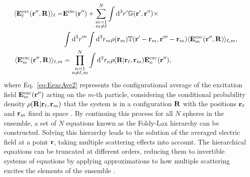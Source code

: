 %
\begin{subequations}%
	\begin{align}%
		\langle \vb{E}_\ell^\text{exc}(\vb{r}'',\vb{R})\rangle_\ell =& \vb{E}^\text{inc}(\vb{r}'')
		+ \sum_{\substack{m =1 \\ m\neq \ell}}^N  \int\dd^3 r' \mathbb{G}(\vb{r}',\vb{r}'') \times \notag\\
		& \int\dd^3 r'''\int \dd^3 r_m \rho(\vb{r}_m) \mathbb{T}(\vb{r}'-\vb{r}_m,\vb{r}'''-\vb{r}_m) \langle \vb{E}_m^\text{exc}(\vb{r}'',\vb{R})\rangle_{\ell,m},
		\\
		\langle \vb{E}_m^\text{exc}(\vb{r}'',\vb{R})\rangle_{\ell,m}
		&= \prod_{\substack{n =1 \\ n\neq \ell,m}}^N  \int\dd^3 r_n \rho(\vb{R}|\vb{r}_\ell,\vb{r}_m) \vb{E}^\text{exc}_n(\vb{r}''),
		\label{eq:EexcAve2}
	\end{align}%
	\label{eq:EexcQSA}%
\end{subequations}%
%
where Eq.~\eqref{eq:EexcAve2} represents the configurational average of the excitation field $ \vb{E}_m^\text{exc}(\vb{r}'')$ acting on the $m$-th particle, considering the conditional probability density $\rho(\vb{R}|\vb{r}_\ell,\vb{r}_m)$ that the system is in a configuration $\vb{R}$ with the positions $\vb{r}_\ell$ and $\vb{r}_m$ fixed in space \cite{garcia2012multiple,barrera_coherent_2003}. By continuing this process for all $N$ spheres in the ensemble, a set of $N$ equations known as the Foldy-Lax hierarchy \cite{loiko_monolayers_1998} can be constructed. Solving this hierarchy leads to the solution of the averaged electric field at a point $\vb{r}$, taking multiple scattering effects into account. The hierarchical equations can be truncated at different orders, reducing them to invertible systems of equations by applying approximations to how multiple scattering excites the elements of the ensemble  \cite{loiko_monolayers_1998}.

